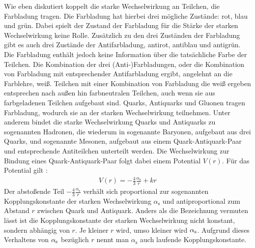 Wie eben diskutiert koppelt die starke Wechselwirkung an Teilchen, die Farbladung tragen.
Die Farbladung hat hierbei drei m\"ogliche Zust\"ande: rot, blau und gr\"un.
Dabei spielt der Zustand der Farbladung f\"ur die St\"arke der starken Wechselwirkung keine Rolle.
Zus\"atzlich zu den drei Zust\"anden der Farbladung gibt es auch drei Zust\"ande der Antifarbladung, antirot, antiblau und antigr\"un.
Die Farbladung enth\"alt jedoch keine Information \"uber die tats\"achliche Farbe der Teilchen.
\newline
Die Kombination der drei (Anti-)Farbladungen, oder die Kombination von Farbladung mit entsprechender Antifarbladung ergibt, angelehnt an die Farblehre, wei{\ss}.
Teilchen mit einer Kombination von Farbladung die wei{\ss} ergeben entsprechen nach au{\ss}en hin farbneutralen Teilchen, auch wenn sie aus farbgeladenen Teilchen aufgebaut sind.
\newline
Quarks, Antiquarks und Gluonen tragen Farbladung, wodurch sie an der starken Wechselwirkung teilnehmen.
Unter anderem bindet die starke Wechselwirkung Quarks und Antiquarks zu sogenannten Hadronen, die wiederum in sogenannte Baryonen, aufgebaut aus drei Quarks, und sogenannte Mesonen, aufgebaut aus einem Quark-Antiquark-Paar und entsprechende Antiteilchen unterteilt werden.
\newline
Die Wechselwirkung zur Bindung eines Quark-Antiquark-Paar folgt dabei einem Potential $V(r)$.
F\"ur das Potential gilt \cite{script:kt1}:
\begin{align} \label{eq:Potential}
V(r) = -\frac{4}{3}\frac{\alpha_\text{s}}{r} + kr 
\end{align}
Der absto{\ss}ende Teil $-\frac{4}{3}\frac{\alpha_\text{s}}{r}$ verh\"alt sich proportional zur sogenannten Kopplungskonstante der starken Wechselwirkung $\alpha_{\text{s}}$ und antiproportional zum Abstand $r$ zwischen Quark und Antiquark.
Anders als die Bezeichnung vermuten l\"asst ist die Kopplungskonstante der starken Wechselwirkung nicht konstant, sondern abh\"angig von $r$.
Je kleiner $r$ wird, umso kleiner wird $\alpha_{\rm{s}}$.
Aufgrund dieses Verhaltens von $\alpha_{\rm{s}}$ bez\"uglich $r$ nennt man $\alpha_\text{s}$ auch laufende Kopplungskonstante.
